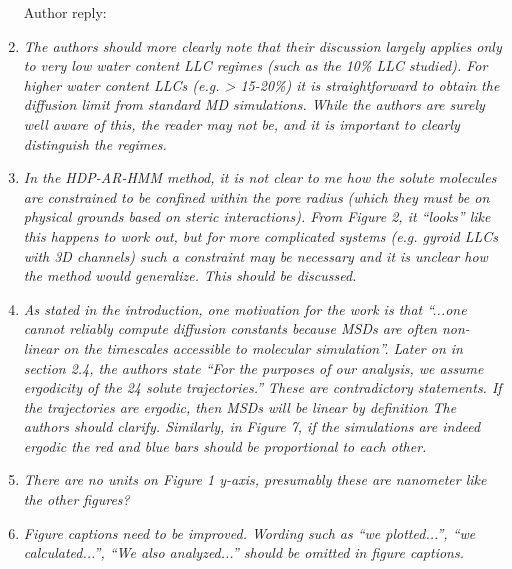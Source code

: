 \documentclass{article}
\begin{document}
\begin{enumerate}[label={Comment \theenumi :}, leftmargin=3.9\parindent]
    Author reply:

    \item \textit{The authors should more clearly note that their discussion largely applies only 
    to very low water content LLC regimes (such as the 10\% LLC studied). For higher water content 
    LLCs (e.g. > 15-20\%) it is straightforward to obtain the diffusion limit from standard MD 
    simulations. While the authors are surely well aware of this, the reader may not be, and it is
    important to clearly distinguish the regimes.}

    \item \textit{In the HDP-AR-HMM method, it is not clear to me how the solute molecules are 
    constrained to be confined within the pore radius (which they must be on physical grounds 
    based on steric interactions). From Figure 2, it “looks” like this happens to work out, but
    for more complicated systems (e.g. gyroid LLCs with 3D channels) such a constraint may be 
    necessary and it is unclear how the method would generalize. This should be discussed.}
    
    \item \textit{As stated in the introduction, one motivation for the work is that “...one 
    cannot reliably compute diffusion constants because MSDs are often non-linear on the timescales
    accessible to molecular simulation”. Later on in section 2.4, the authors state “For the 
    purposes of our analysis, we assume ergodicity of the 24 solute trajectories.” These are 
    contradictory statements. If the trajectories are ergodic, then MSDs will be linear by 
    definition The authors should clarify. Similarly, in Figure 7, if the simulations are indeed 
    ergodic the red and blue bars should be proportional to each other.}
    
    \item \textit{There are no units on Figure 1 y-axis, presumably these are nanometer like the 
    other figures?}
    
    \item \textit{Figure captions need to be improved. Wording such as “we plotted...”, “we 
    calculated...”, “We also analyzed...” should be omitted in figure captions.}
  
%  
  
		  
  \end{enumerate}
\end{document}
